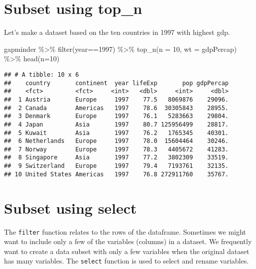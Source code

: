 \documentclass[
]{book}
\newenvironment{Shaded}{\begin{snugshade}}{\end{snugshade}}
\newcommand{\AttributeTok}[1]{\textcolor[rgb]{0.77,0.63,0.00}{#1}}
\newcommand{\DecValTok}[1]{\textcolor[rgb]{0.00,0.00,0.81}{#1}}
\newcommand{\FunctionTok}[1]{\textcolor[rgb]{0.00,0.00,0.00}{#1}}
\newcommand{\NormalTok}[1]{#1}
\newcommand{\SpecialCharTok}[1]{\textcolor[rgb]{0.00,0.00,0.00}{#1}}
\begin{document}
\hypertarget{subset-using-top_n}{%
\section{Subset using top\_n}\label{subset-using-top_n}}

Let's make a dataset based on the ten countries in 1997 with highest gdp.

\begin{Shaded}
\begin{Highlighting}[]
\NormalTok{gapminder }\SpecialCharTok{\%\textgreater{}\%} 
  \FunctionTok{filter}\NormalTok{(year}\SpecialCharTok{==}\DecValTok{1997}\NormalTok{) }\SpecialCharTok{\%\textgreater{}\%}
  \FunctionTok{top\_n}\NormalTok{(}\AttributeTok{n =} \DecValTok{10}\NormalTok{, }\AttributeTok{wt =}\NormalTok{ gdpPercap) }\SpecialCharTok{\%\textgreater{}\%}
  \FunctionTok{head}\NormalTok{(}\AttributeTok{n=}\DecValTok{10}\NormalTok{)}
\end{Highlighting}
\end{Shaded}

\begin{verbatim}
## # A tibble: 10 x 6
##    country       continent  year lifeExp       pop gdpPercap
##    <fct>         <fct>     <int>   <dbl>     <int>     <dbl>
##  1 Austria       Europe     1997    77.5   8069876    29096.
##  2 Canada        Americas   1997    78.6  30305843    28955.
##  3 Denmark       Europe     1997    76.1   5283663    29804.
##  4 Japan         Asia       1997    80.7 125956499    28817.
##  5 Kuwait        Asia       1997    76.2   1765345    40301.
##  6 Netherlands   Europe     1997    78.0  15604464    30246.
##  7 Norway        Europe     1997    78.3   4405672    41283.
##  8 Singapore     Asia       1997    77.2   3802309    33519.
##  9 Switzerland   Europe     1997    79.4   7193761    32135.
## 10 United States Americas   1997    76.8 272911760    35767.
\end{verbatim}

\hypertarget{subset-using-select}{%
\section{Subset using select}\label{subset-using-select}}

The \texttt{filter} function relates to the rows of the dataframe. Sometimes we might want to include only a few of the variables (columns) in a dataset. We frequently want to create a data subset with only a few variables when the original dataset has many variables. The \texttt{select} function is used to select and rename variables.
\end{document}
